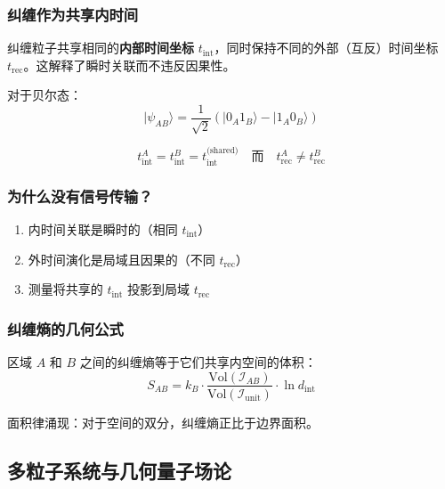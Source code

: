 \subsubsection{纠缠作为共享内时间}

\begin{insight}[纠缠的几何本质]
纠缠粒子共享相同的\textbf{内部时间坐标} $t_{\text{int}}$，同时保持不同的外部（互反）时间坐标 $t_{\text{rec}}$。这解释了瞬时关联而不违反因果性。
\end{insight}

对于贝尔态：
\begin{equation}
    |\psi_{AB}\rangle = \frac{1}{\sqrt{2}}(|0_A 1_B\rangle - |1_A 0_B\rangle)
\end{equation}

\begin{equation}
    t_{\text{int}}^A = t_{\text{int}}^B = t_{\text{int}}^{\text{(shared)}}
    \quad \text{而} \quad
    t_{\text{rec}}^A \neq t_{\text{rec}}^B
\end{equation}

\subsubsection{为什么没有信号传输？}

\begin{enumerate}
    \item 内时间关联是瞬时的（相同 $t_{\text{int}}$）
    \item 外时间演化是局域且因果的（不同 $t_{\text{rec}}$）
    \item 测量将共享的 $t_{\text{int}}$ 投影到局域 $t_{\text{rec}}$
\end{enumerate}

\subsubsection{纠缠熵的几何公式}

\begin{theorem}[纠缠熵作为几何体积]
区域 $A$ 和 $B$ 之间的纠缠熵等于它们共享内空间的体积：
\begin{equation}
    S_{AB} = k_B \cdot \frac{\text{Vol}(\mathcal{I}_{AB})}{\text{Vol}(\mathcal{I}_{\text{unit}})} \cdot \ln d_{\text{int}}
\end{equation}
\end{theorem}

面积律涌现：对于空间的双分，纠缠熵正比于边界面积。

\subsection{多粒子系统与几何量子场论}


